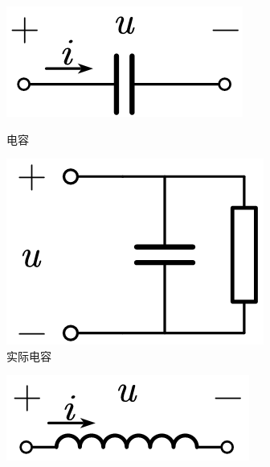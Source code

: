 \documentclass[UTF8]{report}
\theoremstyle{MyLineTheoremStyle} %
\theoremstyle{MyBlockTheoremStyle} %
\theoremstyle{MySubsubsectionStyle} %
\begin{document}
\begin{figure}[H]\centering
\begin{subfigure}[b]{0.21\columnwidth}\centering
    \includegraphics[width=\columnwidth]{assets/5/电容.png}\
    \vspace*{3mm}
    \caption{电容}
\end{subfigure}
\begin{subfigure}[b]{0.21\columnwidth}\centering
    \includegraphics[width=\columnwidth]{assets/5/实际电容.png}
    \caption{实际电容}
\end{subfigure}\hfill
\begin{subfigure}[b]{0.21\columnwidth}\centering
    \includegraphics[width=\columnwidth]{assets/5/电感.png}

\end{subfigure}
\end{figure}
\end{document}
